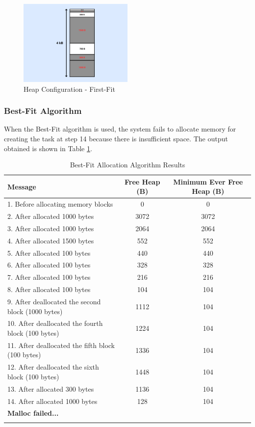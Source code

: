 \begin{figure}[H]
    \centering
    \includegraphics[width=0.5\textwidth]{img/first-worst.png}
    \caption{Heap Configuration - First-Fit}
    \label{fig:Heap Configuration - First-Fit}
\end{figure}

\newpage
\subsubsection{Best-Fit Algorithm}
When the Best-Fit algorithm is used, the system fails to allocate memory for creating the task at step 14 because there is insufficient space. The output obtained is shown in Table \ref{tab:bestfit}.
\begin{longtable}{|l|c|c|}
    \hline
    \textbf{Message} & \textbf{Free Heap (B)} & \textbf{Minimum Ever Free Heap (B)} \\
    \hline
    1. Before allocating memory blocks & 0 & 0 \\
    2. After allocated 1000 bytes & 3072 & 3072 \\
    3. After allocated 1000 bytes & 2064 & 2064 \\
    4. After allocated 1500 bytes & 552 & 552 \\
    5. After allocated 100 bytes & 440 & 440 \\
    6. After allocated 100 bytes & 328 & 328 \\
    7. After allocated 100 bytes & 216 & 216 \\
    8. After allocated 100 bytes & 104 & 104 \\
    9. After deallocated the second block (1000 bytes) & 1112 & 104 \\
    10. After deallocated the fourth block (100 bytes) & 1224 & 104 \\
    11. After deallocated the fifth block (100 bytes) & 1336 & 104 \\
    12. After deallocated the sixth block (100 bytes) & 1448 & 104 \\
    13. After allocated 300 bytes & 1136 & 104 \\
    14. After allocated 1000 bytes & 128 & 104 \\
    \hline
    \textbf{Malloc failed...} & & \\
    \hline
    \caption{Best-Fit Allocation Algorithm Results}
    \label{tab:bestfit}
\end{longtable}

